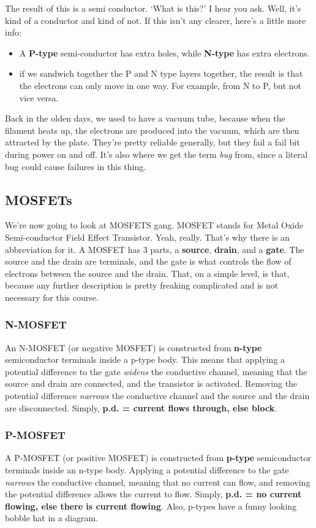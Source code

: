 \documentclass[11pt,a4paper,titlepage,dvipsnames,cmyk]{scrartcl}
\begin{document}
The result of this is a semi conductor. `What is this?' I hear you ask. Well,
it's kind of a conductor and kind of not. If this isn't any clearer, here's a
little more info:
\begin{itemize}
    \item A \textbf{P-type} semi-conductor has extra holes, while
        \textbf{N-type} has extra electrons.
    \item if we sandwich together the P and N type layers together, the result
        is that the electrons can only move in one way. For example, from N to
        P, but not vice versa.
\end{itemize}

Back in the olden days, we used to have a vacuum tube, because when the filament
heats up, the electrons are produced into the vacuum, which are then attracted
by the plate. They're pretty reliable generally, but they fail a fail bit during
power on and off. It's also where we get the term \textit{bug} from, since a
literal bug could cause failures in this thing.

\subsection{MOSFETs}%
\label{sub:MOSFETs}
We're now going to look at MOSFETS gang. MOSFET stands for Metal Oxide
Semi-conductor Field Effect Transistor. Yeah, really. That's why there is an
abbreviation for it. A MOSFET has 3 parts, a \textbf{source}, \textbf{drain},
and a \textbf{gate}. The source and the drain are terminals, and the gate is
what controls the flow of electrons between the source and the drain. That, on a
simple level, is that, because any further description is pretty freaking
complicated and is not necessary for this course.

\subsubsection{N-MOSFET}%
\label{ssub:N-MOSFET}
An N-MOSFET (or negative MOSFET) is constructed from \textbf{n-type}
semiconductor terminals inside a p-type body. This means that applying a
potential difference to
the gate \textit{widens} the conductive channel, meaning that the source and
drain are connected, and the transistor is activated. Removing the potential
difference
\textit{narrows} the conductive channel and the source and the drain are
disconnected. Simply, \textbf{p.d. = current flows through, else block}.

\subsubsection{P-MOSFET}%
\label{ssub:P-MOSFET}
A P-MOSFET (or positive MOSFET) is constructed from \textbf{p-type}
semiconductor terminals inside an n-type body. Applying a potential difference to the gate
\textit{narrows} the conductive channel, meaning that no current can flow, and
removing the potential difference allows the current to flow. Simply, \textbf{p.d. = no
current flowing, else there is current flowing}. Also, p-types have a funny
looking bobble hat in a diagram.
\end{document}
